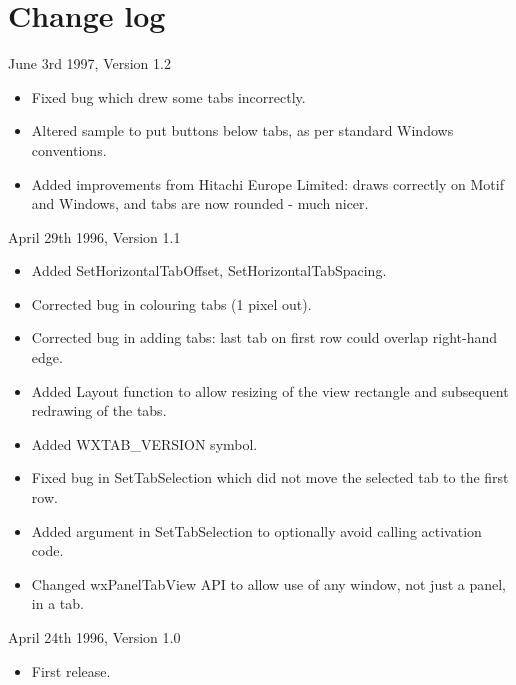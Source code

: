 \chapter{Change log}\label{changes}
%
\setfooter{\thepage}{}{}{}{}{\thepage}%

June 3rd 1997, Version 1.2

\begin{itemize}\itemsep=0pt
\item Fixed bug which drew some tabs incorrectly.
\item Altered sample to put buttons below tabs, as per standard
Windows conventions.
\item Added improvements from Hitachi Europe Limited: draws correctly
on Motif and Windows, and tabs are now rounded - much nicer.
\end{itemize}

April 29th 1996, Version 1.1

\begin{itemize}\itemsep=0pt
\item Added SetHorizontalTabOffset, SetHorizontalTabSpacing.
\item Corrected bug in colouring tabs (1 pixel out).
\item Corrected bug in adding tabs: last tab on first row could overlap right-hand
edge.
\item Added Layout function to allow resizing of the view rectangle and subsequent redrawing
of the tabs.
\item Added WXTAB\_VERSION symbol.
\item Fixed bug in SetTabSelection which did not move the selected tab to the first row.
\item Added argument in SetTabSelection to optionally avoid calling activation code.
\item Changed wxPanelTabView API to allow use of any window, not just a panel, in a tab.
\end{itemize}

April 24th 1996, Version 1.0

\begin{itemize}\itemsep=0pt
\item First release.
\end{itemize}


